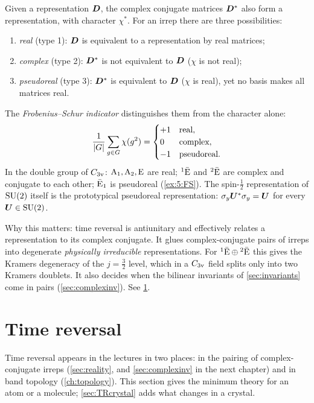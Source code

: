 Given a representation $\bm{D}$, the complex conjugate matrices $\bm{D}^{*}$ also form
a representation, with character $\chi^{*}$. For an irrep there are three
possibilities:
\begin{enumerate}
\item \emph{real} (type 1): $\bm{D}$ is equivalent to a representation by real
      matrices;
\item \emph{complex} (type 2): $\bm{D}^{*}$ is not equivalent to $\bm{D}$
      ($\chi$ is not real);
\item \emph{pseudoreal} (type 3): $\bm{D}^{*}$ is equivalent to $\bm{D}$ ($\chi$ is real),
      yet no basis makes all matrices real.
\end{enumerate}
The \emph{Frobenius--Schur indicator} distinguishes them from the character alone:
\begin{equation}\label{eq:FS}
\frac{1}{\lvert G\rvert}\sum_{g\in G}\chi(g^2)=
\begin{cases}+1&\text{real},\\ 0&\text{complex},\\ -1&\text{pseudoreal.}\end{cases}
\end{equation}
In the double group of $C_{3\mathrm{v}}$: $\mathrm{A}_1,\mathrm{A}_2,\mathrm{E}$ are real; ${}^{1}\bar{\mathrm{E}}$
and ${}^{2}\bar{\mathrm{E}}$ are complex and conjugate to each other; $\bar{\mathrm{E}}_1$ is
pseudoreal (\cref{ex:5:FS}). The spin-$\tfrac12$ representation of $\mathrm{SU}(2)$ itself is the
prototypical pseudoreal representation: $\sigma_y\bm{U}^{*}\sigma_y=\bm{U}$ for every
$\bm{U}\in\mathrm{SU}(2)$.

Why this matters: time reversal is antiunitary and effectively relates a
representation to its complex conjugate. It glues complex-conjugate pairs of irreps
into degenerate \emph{physically irreducible} representations. For
${}^{1}\bar{\mathrm{E}}\oplus{}^{2}\bar{\mathrm{E}}$ this gives the Kramers degeneracy of the
$j=\tfrac32$ level, which in a $C_{3\mathrm{v}}$ field splits only into two Kramers doublets. It
also decides when the bilinear invariants of \cref{sec:invariants} come in pairs
(\cref{sec:complexinv}). See \cref{sec:TR}.

\section{Time reversal\beyondmark}\label{sec:TR}

Time reversal appears in the lectures in two places: in the pairing of
complex-conjugate irreps (\cref{sec:reality}, and \cref{sec:complexinv} in the next
chapter) and in band topology (\cref{ch:topology}). This section gives the minimum
theory for an atom or a molecule; \cref{sec:TRcrystal} adds what changes in a crystal.

